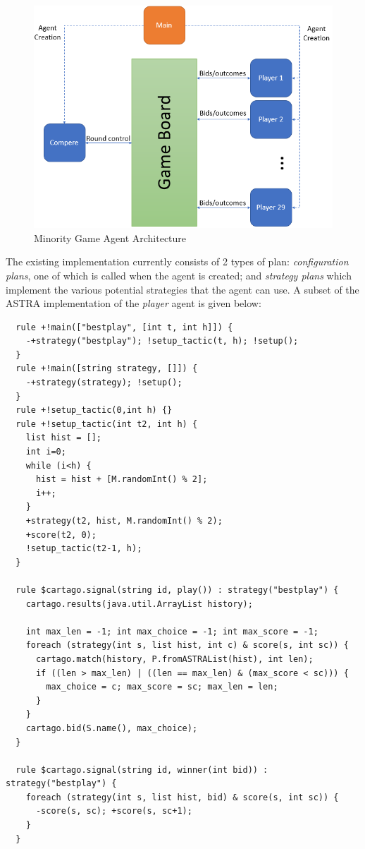 \begin{figure}[!tbh]
\centering
\includegraphics[width=.7\linewidth]{mg.png}
\caption{Minority Game Agent Architecture}
\label{fig:mgagents}
\end{figure}

The existing implementation currently consists of 2 types of plan: \emph{configuration plans}, one of which is
called when the agent is created; and \emph{strategy plans} which implement the various potential strategies
that the agent can use. A subset of the ASTRA implementation of the \emph{player} agent is given below:

{\footnotesize
\begin{verbatim}
  rule +!main(["bestplay", [int t, int h]]) {
    -+strategy("bestplay"); !setup_tactic(t, h); !setup();
  }
  rule +!main([string strategy, []]) { 
    -+strategy(strategy); !setup();
  }
  rule +!setup_tactic(0,int h) {}
  rule +!setup_tactic(int t2, int h) {
    list hist = [];
    int i=0;
    while (i<h) {
      hist = hist + [M.randomInt() % 2];
      i++;
    }
    +strategy(t2, hist, M.randomInt() % 2);
    +score(t2, 0);
    !setup_tactic(t2-1, h);
  }
		
  rule $cartago.signal(string id, play()) : strategy("bestplay") {
    cartago.results(java.util.ArrayList history);
		
    int max_len = -1; int max_choice = -1; int max_score = -1;
    foreach (strategy(int s, list hist, int c) & score(s, int sc)) {
      cartago.match(history, P.fromASTRAList(hist), int len);
      if ((len > max_len) | ((len == max_len) & (max_score < sc))) {
        max_choice = c;	max_score = sc; max_len = len;
      }
    }
    cartago.bid(S.name(), max_choice);
  }
		
  rule $cartago.signal(string id, winner(int bid)) : strategy("bestplay") {
    foreach (strategy(int s, list hist, bid) & score(s, int sc)) {
      -score(s, sc); +score(s, sc+1);
    }
  }
\end{verbatim}}

